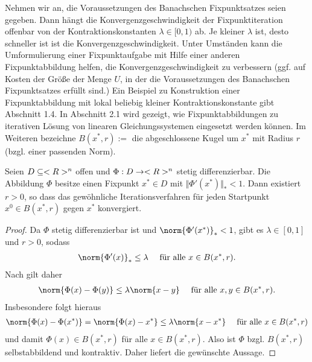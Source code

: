 Nehmen wir an, die Voraussetzungen des Banachschen Fixpunktsatzes seien gegeben. Dann hängt die Konvergenzgeschwindigkeit der Fixpunktiteration offenbar von der Kontraktionskonstanten $\lambda \in [0,1)$ ab. Je kleiner $\lambda$ ist, desto schneller ist ist die Konvergenzgeschwindigkeit. Unter Umständen kann die Umformulierung einer Fixpunktaufgabe mit Hilfe einer anderen Fixpunktabbildung helfen, die Konvergenzgeschwindigkeit zu verbessern (ggf. auf Kosten der Größe der Menge $U$, in der die Voraussetzungen des Banachschen Fixpunktsatzes erfüllt sind.) Ein Beispiel zu Konstruktion einer Fixpunktabbildung mit lokal beliebig kleiner Kontraktionskonstante gibt Abschnitt 1.4. In Abschnitt 2.1 wird gezeigt, wie Fixpunktabbildungen zu iterativen Lösung von linearen Gleichungssystemen eingesetzt werden können.
Im Weiteren bezeichne $B(x^{\ast}, r) :=$ die abgeschlossene Kugel um $x^{\ast}$ mit Radius $r$ (bzgl. einer passenden Norm).

\begin{proposition}
	Seien $D \subseteq <R>^n$ offen und $\Phi: D \to <R>^n$ stetig differenzierbar. Die Abbildung $\Phi$ besitze einen Fixpunkt $x^{\ast} \in D$ mit $\Vert \Phi'(x^{\ast})\Vert_{\ast} < 1$. Dann existiert $r > 0$, so dass das gewöhnliche Iterationsverfahren für jeden Startpunkt $x^0 \in B(x^{\ast}, r)$ gegen $x^{\ast}$ konvergiert.
\end{proposition}

\begin{proof}
	Da $\Phi$ stetig differenzierbar ist und $\norm{\Phi'(x^\ast)}_{\ast} < 1$, gibt es $\lambda \in[0,1]$ und $r > 0$, sodass
	\begin{align}
		\norm{\Phi'(x)}_{\ast} \le \lambda \quad \text{ für alle } x\in B(x^\ast,r).\notag
	\end{align}
	Nach  gilt daher
	\begin{align}
		\norm{\Phi(x) - \Phi(y)}\le \lambda\norm{x-y} \quad\text{ für alle }x,y \in B(x^\ast,r).
	\end{align}
	Insbesondere folgt hieraus
	\begin{align}
		\norm{\Phi(x) - \Phi(x^\ast)} = \norm{\Phi(x) - x^\ast} \le \lambda \norm{x-x^\ast} \quad \text{ für alle } x \in B(x^\ast,r)
	\end{align}
	und damit $\Phi(x) \in B(x^\ast,r)$ für alle $x \in B(x^\ast,r)$. Also ist $\Phi$ bzgl. $B(x^\ast,r)$ selbstabbildend und kontraktiv. Daher liefert  die gewünschte Aussage.
\end{proof}